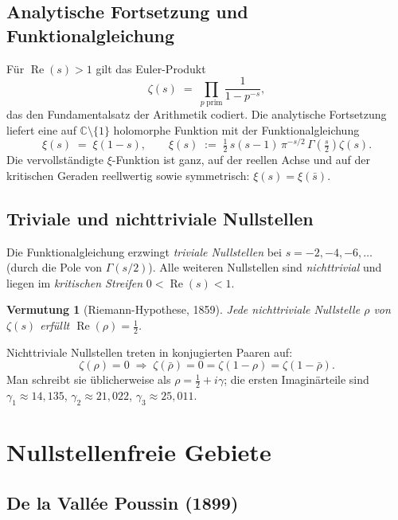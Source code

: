 \documentclass[12pt,a4paper]{article}
\newtheorem{vermutung}[theorem]{Vermutung}
\theoremstyle{remark}
\begin{document}
\subsection{Analytische Fortsetzung und Funktionalgleichung}

Für $\operatorname{Re}(s)>1$ gilt das Euler-Produkt
\[
  \zeta(s) \;=\; \prod_{p\;\text{prim}} \frac{1}{1 - p^{-s}},
\]
das den Fundamentalsatz der Arithmetik codiert.  Die analytische Fortsetzung liefert eine
auf $\mathbb{C}\setminus\{1\}$ holomorphe Funktion mit der Funktionalgleichung
\begin{equation}\label{eq:func}
  \xi(s) \;=\; \xi(1-s),
  \qquad
  \xi(s) \;:=\; \tfrac{1}{2}\,s(s-1)\,\pi^{-s/2}\,\Gamma\!\left(\tfrac{s}{2}\right)\zeta(s).
\end{equation}
Die vervollständigte $\xi$-Funktion ist ganz, auf der reellen Achse und auf der kritischen
Geraden reellwertig sowie symmetrisch: $\xi(s)=\xi(\bar{s})$.

\subsection{Triviale und nichttriviale Nullstellen}

Die Funktionalgleichung erzwingt \emph{triviale Nullstellen} bei $s=-2,-4,-6,\ldots$
(durch die Pole von $\Gamma(s/2)$).  Alle weiteren Nullstellen sind \emph{nichttrivial}
und liegen im \emph{kritischen Streifen} $0<\operatorname{Re}(s)<1$.

\begin{vermutung}[Riemann-Hypothese, 1859]
  Jede nichttriviale Nullstelle $\rho$ von $\zeta(s)$ erfüllt $\operatorname{Re}(\rho)=\tfrac{1}{2}$.
\end{vermutung}

Nichttriviale Nullstellen treten in konjugierten Paaren auf:
\[
  \zeta(\rho)=0 \;\Longrightarrow\; \zeta(\bar\rho)=0=\zeta(1-\rho)=\zeta(1-\bar\rho).
\]
Man schreibt sie üblicherweise als $\rho=\tfrac{1}{2}+i\gamma$; die ersten Imaginärteile
sind $\gamma_1\approx14{,}135$, $\gamma_2\approx21{,}022$, $\gamma_3\approx25{,}011$.

\section{Nullstellenfreie Gebiete}

\subsection{De la Vallée Poussin (1899)}
\end{document}
